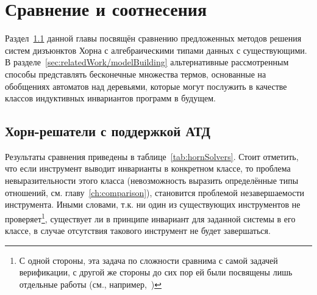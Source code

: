 \chapter{Сравнение и соотнесения}\label{ch:relatedWork}


Раздел~\cref{sec:relatedWork/hornSolvers} данной главы посвящён сравнению предложенных методов решения систем дизъюнктов Хорна с алгебраическими типами данных с существующими.
В разделе~\cref{sec:relatedWork/modelBuilding} альтернативные рассмотренным способы представлять бесконечные множества термов, основанные на обобщениях автоматов над деревьями, которые могут послужить в качестве классов индуктивных инвариантов программ в будущем.

\section{Хорн-решатели с поддержкой АТД}\label{sec:relatedWork/hornSolvers}

Результаты сравнения приведены в таблице~\cref{tab:hornSolvers}.
Стоит отметить, что если инструмент выводит инварианты в конкретном классе, то проблема невыразительности этого класса (невозможность выразить определённые типы отношений, см. главу~\cref{ch:comparison}), становится проблемой незавершаемости инструмента. Иными словами, т.\:к. ни один из существующих инструментов не проверяет\footnote{С одной стороны, эта задача по сложности сравнима с самой задачей верификации, с другой же стороны до сих пор ей были посвящены лишь отдельные работы (см., например,~\cite{10.1145/3022187,10.1145/2837614.2837640})}, существует ли в принципе инвариант для заданной системы в его классе, в случае отсутствия такового инструмент не будет завершаться.

